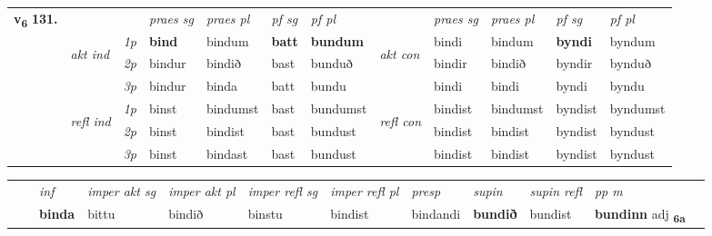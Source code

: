 \begin{tabular}{llllllllllll} \toprule
\multirow{4}{*}{{{\textbf{v{\textsubscript{6}}} \Large{\textbf{131.}}}}}  & &   &  \textit{praes sg}  & \textit{praes pl}  &\textit{ pf sg} & \textit{pf pl} &  &  \textit{praes sg}  & \textit{praes pl}  & \textit{pf sg} & \textit{pf pl } \\*
	\cmidrule{4-7} \cmidrule{9-12}
 & \multirow{3}{*}{\begin{turn}{90}\textit{akt ind}\end{turn}} & {\textit{1p}} & \textbf{bind} & bindum    & \textbf{batt} & \textbf{bundum} & \multirow{3}{*}{\begin{turn}{90}\textit{akt con}\end{turn}} &bindi & bindum & \textbf{byndi} & byndum\\*
& &  {\textit{2p}} &  bindur  & bindið   & bast & bunduð & & bindir & bindið & byndir & bynduð \\*
& &  {\textit{3p}} & bindur & binda   & batt & bundu & & bindi & bindi& byndi & byndu  \\*
\cmidrule{4-7} \cmidrule{9-12}
 &\multirow{3}{*}{\begin{turn}{90}\textit{refl ind}\end{turn}} & {\textit{1p}} & binst & bindumst    & bast & bundumst & \multirow{3}{*}{\begin{turn}{90}\textit{refl con}\end{turn}}  &bindist & bindumst & byndist & byndumst\\*
 &&  {\textit{2p}} &  binst  & bindist   & bast & bundust & &bindist & bindist & byndist & byndust \\*
& &  {\textit{3p}} & binst & bindast   & bast & bundust & & bindist & bindist& byndist & byndust  \\*
\cmidrule{4-7} \cmidrule{9-12}
\end{tabular}


\begin{tabular}{llllllllllll}
 & & \textit{inf} & \textit{imper akt sg} & \textit{imper akt pl} & \textit{imper refl sg} & \textit{imper refl pl} & \textit{presp} & \textit{supin} & \textit{supin refl} & \textit{pp m}     \\*
  & & \textbf{binda} & bittu  & bindið & binstu & bindist & bindandi &  \textbf{bundið} & bundist & \textbf{bundinn} adj \textbf{\textsubscript{6a}} \\*
\cmidrule{1-12}
\end{tabular}



